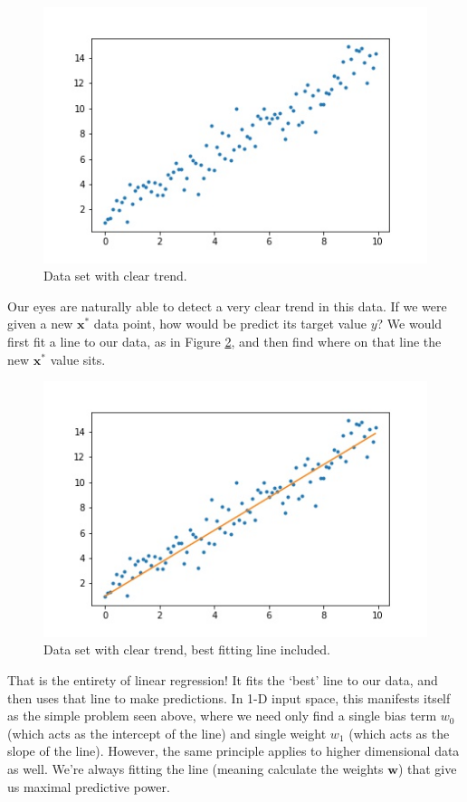 \begin{figure}
    \centering
    \includegraphics[width=0.5\paperwidth]{../LinearRegression/fig/simple_lin_reg_GEN.jpg}
    \caption{Data set with clear trend.}
    \label{fig:simple-lin-reg}
\end{figure}

Our eyes are naturally able to detect a very clear trend in this data. If we were given a new $\textbf{x}^{*}$ data point, how would be predict its target value $y$? We would first fit a line to our data, as in Figure \ref{fig:simple-lin-reg-w-line}, and then find where on that line the new $\textbf{x}^{*}$ value sits.

\begin{figure}
    \centering
    \includegraphics[width=0.5\paperwidth]{../LinearRegression/fig/simple_lin_reg_w_line_GEN.jpg}
    \caption{Data set with clear trend, best fitting line included.}
    \label{fig:simple-lin-reg-w-line}
\end{figure}

That is the entirety of linear regression! It fits the `best' line to our data, and then uses that line to make predictions. In 1-D input space, this manifests itself as the simple problem seen above, where we need only find a single bias term $w_{0}$ (which acts as the intercept of the line) and single weight $w_{1}$ (which acts as the slope of the line). However, the same principle applies to higher dimensional data as well. We're always fitting the line (meaning calculate the weights $\textbf{w}$) that give us maximal predictive power.

